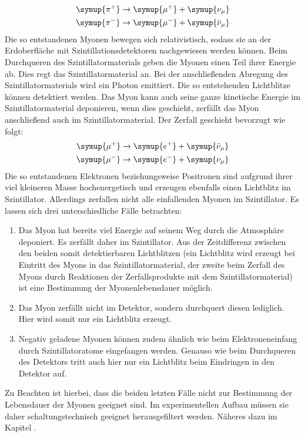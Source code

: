\begin{align}
  \symup{\pi^+}\to\symup{\mu^+}+\symup{\nu_\mu}\\
  \symup{\pi^-}\to\symup{\mu^-}+\symup{\bar{\nu}_\mu}
\end{align}
Die so entstandenen Myonen bewegen sich relativistisch, sodass sie an der Erdoberfläche mit Szintillationsdetektoren nachgewiesen werden können.
Beim Durchqueren des Szintillatormaterials geben die Myonen einen Teil ihrer Energie ab. Dies regt das Szintillatormaterial an. Bei der anschließenden Abregung des Szintillatormaterials wird ein Photon emittiert.
Die so entstehenden Lichtblitze können detektiert werden.
Das Myon kann auch seine ganze kinetische Energie im Szintillatormaterial deponieren, wenn dies geschieht, zerfällt das Myon anschließend auch im Szintillatormaterial.
Der Zerfall geschieht bevorzugt wie folgt:
\begin{align}
  \symup{\mu^+}\to\symup{e^+}+\symup{\bar{\nu}_\mu} \\
  \symup{\mu^-}\to\symup{e^-}+\symup{\nu_\mu}
\end{align}
Die so entstandenen Elektronen beziehungsweise Positronen sind aufgrund ihrer viel kleineren Masse hochenergetisch und erzeugen ebenfalls einen Lichtblitz im Szintillator.
Allerdings zerfallen nicht alle einfallenden Myonen im Szintillator.
Es lassen sich drei unterschiedliche Fälle betrachten:
\begin{enumerate}
  \item Das Myon hat bereits viel Energie auf seinem Weg durch die Atmosphäre deponiert. Es zerfällt daher im Szintillator. Aus der Zeitdifferenz zwischen den beiden somit detektierbaren Lichtblitzen (ein Lichtblitz wird erzeugt bei Eintritt des Myons in das Szintillatormaterial, der zweite beim Zerfall des Myons durch Reaktionen der Zerfallsprodukte mit dem Szintillatormaterial) ist eine Bestimmung der Myonenlebensdauer möglich.
  \item Das Myon zerfällt nicht im Detektor, sondern durchquert diesen lediglich. Hier wird somit nur ein Lichtblitz erzeugt.
  \item Negativ geladene Myonen können zudem ähnlich wie beim Elektroneneinfang durch Szintillatoratome eingefangen werden. Genauso wie beim Durchqueren des Detektors tritt auch hier nur ein Lichtblitz beim Eindringen in den Detektor auf.
\end{enumerate}

Zu Beachten ist hierbei, dass die beiden letzten Fälle nicht zur Bestimmung der Lebensdauer der Myonen geeignet sind. Im experimentellen Aufbau müssen sie daher schaltungstechnisch geeignet herausgefiltert werden. Näheres dazu im Kapitel \cite{sec:Durchführung}.

